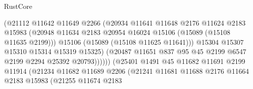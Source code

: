 \begin{lexlean}{RustCore}
\begin{coremodule}
                                      (@21112
                                        @11642
                                        @11649
                                        @2266
                                        (@20934
                                          @11641
                                          @11648
                                          @2176
                                          @11624
                                          @2183
                                          @15983
                                          (@20948
                                            @11634
                                            @2183
                                            @20954
                                            @16024
                                            @15106
                                            (@15089 (@15108 @11635 @2199)))
                                          @15106
                                          (@15089 (@15108 @11625 @11641)))
                                        @15304
                                        @15307
                                        @15310
                                        @15314
                                        @15319
                                        @15325)
                                      (@20487
                                        @11651
                                        @837
                                        @95
                                        @45
                                        @2199
                                        @6547
                                        @2199
                                        @2294
                                        @25392
                                        @20793))))))
                            (@25401
                              @1491
                              @45
                              @11682
                              @11691
                              @2199
                              @11914
                              (@21234
                                @11682
                                @11689
                                @2206
                                (@21241
                                  @11681
                                  @11688
                                  @2176
                                  @11664
                                  @2183
                                  @15983
                                  (@21255
                                    @11674
                                    @2183

\end{coremodule}
\end{lexlean}
